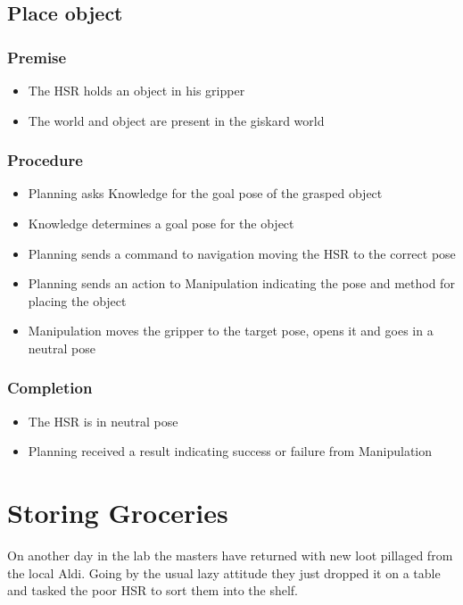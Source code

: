 \documentclass[main.tex]{subfiles}
\begin{document}
	\subsection{Place object}
	
	\subsubsection{Premise}
	\begin{itemize}
		\item The HSR holds an object in his gripper
		\item The world and object are present in the giskard world
	\end{itemize} 
	
	\subsubsection{Procedure}
	\begin{itemize}			
		\item Planning asks Knowledge for the goal pose of the grasped object
		\item Knowledge determines a goal pose for the object
		\item Planning sends a command to navigation moving the HSR to the correct pose
		\item Planning sends an action to Manipulation indicating the pose and method for placing the object
		\item Manipulation moves the gripper to the target pose, opens it and goes in a neutral pose 				
	\end{itemize}
	
	\subsubsection{Completion}
	\begin{itemize}
		\item The HSR is in neutral pose
		\item Planning received a result indicating success or failure from Manipulation				
	\end{itemize}
	
	\section{Storing Groceries}
	On another day in the lab the masters have returned with new loot pillaged from the local Aldi. Going by the usual lazy attitude they just dropped it on a table and tasked the poor HSR to sort them into the shelf. 
	
\end{document}
